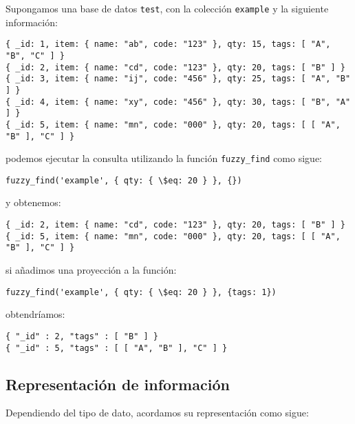 \begin{example}

Supongamos una base de datos \texttt{test}, con la colección \texttt{example} y la siguiente información:

\begin{lstlisting}
{ _id: 1, item: { name: "ab", code: "123" }, qty: 15, tags: [ "A", "B", "C" ] }
{ _id: 2, item: { name: "cd", code: "123" }, qty: 20, tags: [ "B" ] }
{ _id: 3, item: { name: "ij", code: "456" }, qty: 25, tags: [ "A", "B" ] }
{ _id: 4, item: { name: "xy", code: "456" }, qty: 30, tags: [ "B", "A" ] }
{ _id: 5, item: { name: "mn", code: "000" }, qty: 20, tags: [ [ "A", "B" ], "C" ] }
\end{lstlisting}

podemos ejecutar la consulta utilizando la función \texttt{fuzzy\_find} como sigue:

\begin{lstlisting}[numbers=none]
fuzzy_find('example', { qty: { \$eq: 20 } }, {})
\end{lstlisting}

y obtenemos:

\begin{lstlisting}
{ _id: 2, item: { name: "cd", code: "123" }, qty: 20, tags: [ "B" ] }
{ _id: 5, item: { name: "mn", code: "000" }, qty: 20, tags: [ [ "A", "B" ], "C" ] }
\end{lstlisting}

si añadimos una proyección a la función:

\begin{lstlisting}[numbers=none]
fuzzy_find('example', { qty: { \$eq: 20 } }, {tags: 1})
\end{lstlisting}

obtendríamos:

\begin{lstlisting}
{ "_id" : 2, "tags" : [ "B" ] }
{ "_id" : 5, "tags" : [ [ "A", "B" ], "C" ] }
\end{lstlisting}

\end{example}

\subsection{Representación de información}

Dependiendo del tipo de dato, acordamos su representación como sigue:

